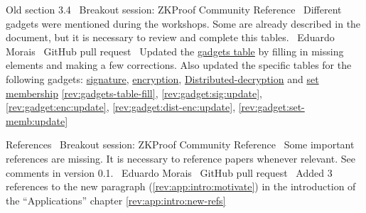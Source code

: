Old section 3.4
\newcol \ccontext\ Breakout session: ZKProof Community Reference
				\propContrib\ Different gadgets were mentioned during the workshops. Some are already described in the document, but it is necessary to review and complete this tables.
\newcol {}
\newcol \contributors\ Eduardo Morais
				\submit\ GitHub pull request
				\Chan\ Updated the \hyperref[tab:list-gadgets]{gadgets table} by filling in missing elements and making a few corrections.
				Also updated the specific tables for the following gadgets: \hyperref[tab:gadget-signature]{signature}, \hyperref[tab:gadget-encryption]{encryption}, \hyperref[tab:gadget-dist-decryption]{Distributed-decryption} and \hyperref[tab:gadget-set-membership]{set membership}				
\newcol \ref{rev:gadgets-table-fill}, \ref{rev:gadget:sig:update}, \ref{rev:gadget:enc:update}, \ref{rev:gadget:dist-enc:update}, \ref{rev:gadget:set-memb:update}
\rowendL
\myendIssue


References
\newcol \ccontext\ Breakout session: ZKProof Community Reference
				\propContrib\ Some important references are missing. It is necessary to reference papers whenever relevant. See comments in version 0.1.
\newcol {}   %
\newcol \contributors\ Eduardo Morais
				\submit\ GitHub pull request
				\Chan\ Added 3 references to the new paragraph (\ref{rev:app:intro:motivate}) in the introduction of the ``Applications'' chapter
\newcol \ref{rev:app:intro:new-refs}
\rowendL
\myendIssue



